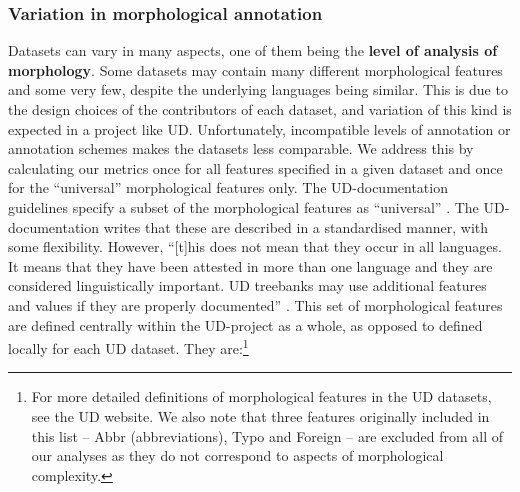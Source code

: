 \documentclass[USenglish]{article}
\begin{document}
\subsubsection{Variation in morphological annotation}
Datasets can vary in many aspects, one of them being the \textbf{level of analysis of morphology}. 
Some datasets may contain many different morphological features and some very few, despite the underlying languages being similar. 
This is due to the design choices of the contributors of each dataset, and variation of this kind is expected in a project like UD.
Unfortunately, incompatible levels of annotation or annotation schemes makes the datasets less comparable.
We address this by calculating our metrics once for all features specified in a given dataset and once for the ``universal'' morphological features only. 
The UD-documentation guidelines specify a subset of the morphological features as ``universal'' \citep{ud_2_feat_website}. 
The UD-documentation writes that these are described in a standardised manner, with some flexibility. 
However, ``[t]his does not mean that they occur in all languages. It means that they have been attested in more than one language and they are considered linguistically important. UD treebanks may use additional features and values if they are properly documented'' \citep{ud_2_feat_website}. 
This set of morphological features are defined centrally within the UD-project as a whole, as opposed to defined locally for each UD dataset. 
They are:\footnote{For more detailed definitions of morphological features in the UD datasets, see the UD website. We also note that three features originally included in this list -- Abbr (abbreviations), Typo and Foreign -- are excluded from all of our analyses as they do not correspond to aspects of morphological complexity.}
\end{document}
